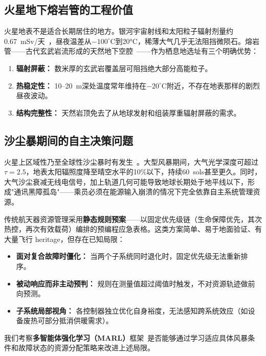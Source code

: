 \documentclass[11pt,a4paper]{ctexart}
\begin{document}
\subsection{火星地下熔岩管的工程价值}

火星地表不是适合长期居住的地方。银河宇宙射线和太阳粒子辐射剂量约0.67~mSv/天~\cite{mars_radiation}，昼夜温差从$-100^\circ$C到20°C，稀薄大气几乎无法阻挡微陨石。熔岩管——古代玄武岩流形成的天然地下空腔~\cite{mars_lava_tube}——作为栖息地选址有三个明确优势：

\begin{enumerate}[label=(\roman*)]
  \item \textbf{辐射屏蔽：} 数米厚的玄武岩覆盖层可阻挡绝大部分高能粒子。
  \item \textbf{热稳定性：} 10--20~m深处温度常年维持在$-20^\circ$C附近，不存在地表那样的剧烈昼夜波动。
  \item \textbf{结构完整性：} 天然岩顶免去了从地球发射和组装厚重辐射屏蔽的需求。
\end{enumerate}

\subsection{沙尘暴期间的自主决策问题}

火星上区域性乃至全球性沙尘暴时有发生~\cite{mars_dust}。大型风暴期间，大气光学深度可超过$\tau = 2.5$，地表太阳辐照度降至晴空水平的10\%以下，持续60~sols甚至更久。同时，大气沙尘衰减无线电信号，加上轨道几何可能导致地球长期处于地平线以下，形成"通讯黑障孤岛"——乘员必须在能源输入崩溃的情况下完全依靠自主系统管理资源。

传统航天器资源管理采用\textbf{静态规则预案}——以固定优先级链（生命保障优先，其次热控，再次有效载荷）编排的预编程应急表格。这类方案简单、易于地面验证、有大量飞行 heritage，但存在已知局限：

\begin{itemize}
  \item \textbf{面对复合故障时僵化：} 当两个子系统同时退化时，固定优先级无法重新排序。
  \item \textbf{被动响应而非主动预判：} 规则在测量值超过阈值时触发，不对资源轨迹做前向预测。
  \item \textbf{子系统局部视角：} 各控制器独立优化自身裕度，无法感知跨系统效应（如设备废热可部分抵消供暖需求）。
\end{itemize}

我们考察\textbf{多智能体强化学习（MARL）}框架~\cite{marl_survey}是否能够通过学习适应具体风暴条件和故障状态的资源分配策略来改进上述局限。
\end{document}
